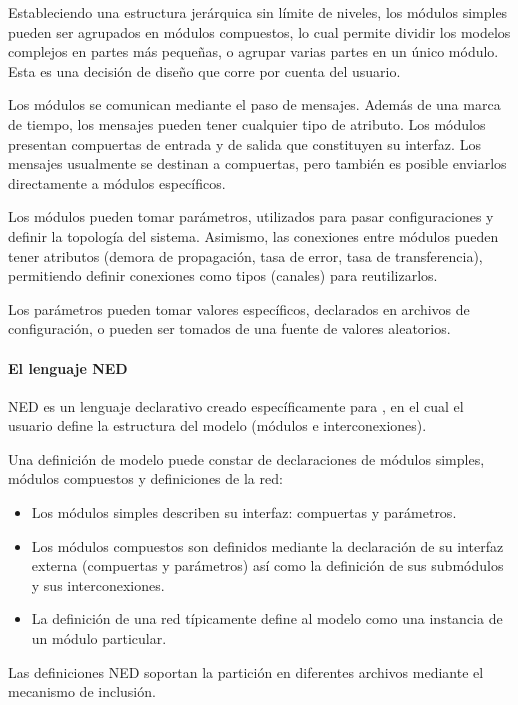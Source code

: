 \documentclass[]{article}
\begin{document}
Estableciendo una estructura jerárquica sin límite de niveles, los módulos
simples pueden ser agrupados en módulos compuestos, lo cual permite dividir los
modelos complejos en partes más pequeñas, o agrupar varias partes en un único
módulo. Esta es una decisión de diseño que corre por cuenta del usuario. 

Los módulos se comunican mediante el paso de mensajes. Además de una marca de
tiempo, los mensajes pueden tener cualquier tipo de atributo. Los módulos
presentan compuertas de entrada y de salida que constituyen su interfaz.  Los
mensajes usualmente se destinan a compuertas, pero también es posible enviarlos
directamente a módulos específicos.

Los módulos pueden tomar parámetros, utilizados para pasar configuraciones y
definir la topología del sistema. Asimismo, las conexiones entre módulos pueden
tener atributos (demora de propagación, tasa de error, tasa de transferencia),
permitiendo definir conexiones como tipos (canales) para reutilizarlos.

Los parámetros pueden tomar valores específicos, declarados en archivos de
configuración, o pueden ser tomados de una fuente de valores aleatorios. 

\paragraph{El lenguaje NED}

NED es un lenguaje declarativo creado específicamente para \omnetpp{}, en el cual
el usuario define la estructura del modelo (módulos e interconexiones).

Una definición de modelo puede constar de declaraciones de módulos simples,
módulos compuestos y definiciones de la red:

\begin{itemize}
    \item Los módulos simples describen su interfaz: compuertas y parámetros.

    \item Los módulos compuestos son definidos mediante la declaración de su
interfaz externa (compuertas y parámetros) así como la definición de sus
submódulos y sus interconexiones.

    \item La definición de una red típicamente define al modelo como una
instancia de un módulo particular.
\end{itemize}

Las definiciones NED soportan la partición en diferentes archivos mediante el
mecanismo de inclusión.
\end{document}
